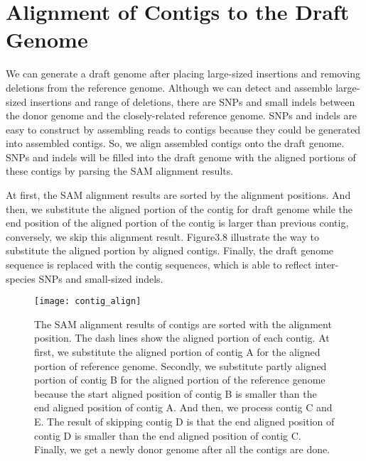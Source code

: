 \section{Alignment of Contigs to the Draft Genome}

We can generate a draft genome after placing large-sized insertions and removing deletions from the reference genome. Although we can detect and assemble large-sized insertions and range of deletions, there are SNPs and small indels between the donor genome and the closely-related reference genome. SNPs and indels are easy to construct by assembling reads to contigs because they could be generated into assembled contigs. So, we align assembled contigs onto the draft genome. SNPs and indels will be filled into the draft genome with the aligned portions of these contigs by parsing the SAM alignment results.

At first, the SAM alignment results are sorted by the alignment positions. And then, we substitute the aligned portion of the contig for draft genome while the end position of the aligned portion of the contig is larger than previous contig, conversely, we skip this alignment result. Figure3.8 illustrate the way to substitute the aligned portion by aligned contigs.
Finally, the draft genome sequence is replaced with the contig sequences, which is able to reflect inter-species SNPs and small-sized indels.

\begin{figure}[ht]
\begin{center}
\texttt{[image: contig\_align]}
\caption{The SAM alignment results of contigs are sorted with the alignment position. The dash lines show the aligned portion of each contig. At first, we substitute the aligned portion of contig A for the aligned portion of reference genome. Secondly, we substitute partly aligned portion of contig B for the aligned portion of the reference genome because the start aligned position of contig B is smaller than the end aligned position of contig A. And then, we process contig C and E. The result of skipping contig D is that the end aligned position of contig D is smaller than the end aligned position of contig C. Finally, we get a newly donor genome after all the contigs are done.}
\label{}
\end{center}
\end{figure}


















